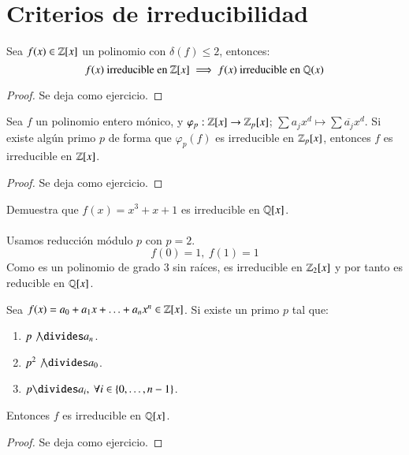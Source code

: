 \section{Criterios de irreducibilidad}

\begin{lm}[de Gauss]
    Sea $f(x) \in \mathbb{Z}[x]$ un polinomio con $\delta(f) \leq 2$, entonces:
    $$
        f(x) \text{ irreducible en } \mathbb{Z}[x] \implies f(x) \text{ irreducible en } \mathbb{Q}(x)
    $$
\end{lm}
\begin{proof}
    Se deja como ejercicio.
\end{proof}


\begin{lm}
    Sea $f$ un polinomio entero mónico, y $\varphi_p: \mathbb{Z}[x] \to \mathbb{Z}_p[x]$; $\sum a_jx^d \mapsto \sum \overline{a_j}x^d$. Si existe algún primo $p$ de forma que $\varphi_p(f)$ es irreducible en $\mathbb{Z}_p[x]$, entonces $f$ es irreducible en $\mathbb{Z}[x]$.
\end{lm}
\begin{proof}
    Se deja como ejercicio.
\end{proof}

\begin{ex}[H1.34 (c)]
    Demuestra que $f(x) = x^3+x+1$ es irreducible en $\mathbb{Q}[x]$.\\\\
    Usamos reducción módulo $p$ con $p = 2$.
    $$
        f(0) = 1,\ f(1) = 1
    $$
    Como es un polinomio de grado $3$ sin raíces, es irreducible en $\mathbb{Z}_2[x]$ y por tanto es reducible en $\mathbb{Q}[x]$.
\end{ex}

\begin{thm}
    Sea $f(x) = a_0 + a_1 x + \ldots + a_n x^n \in \mathbb{Z}[x]$. Si existe un primo $p$ tal que:
    \begin{enumerate}
        \item $p \not \divides a_n$.
        \item $p^2 \not \divides a_0$.
        \item $p \divides a_i,\ \forall i \in \setdef{0, \ldots, n-1} $.
    \end{enumerate}
    Entonces $f$ es irreducible en $\mathbb{Q}[x]$.
\end{thm}
\begin{proof}
    Se deja como ejercicio.
\end{proof}

